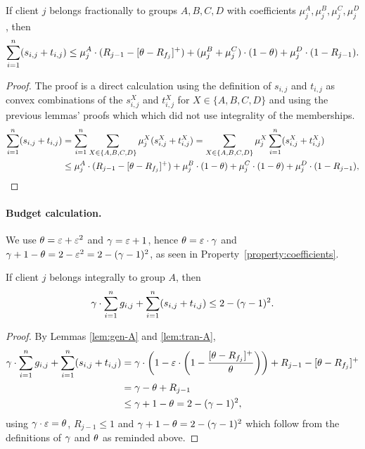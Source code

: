\begin{lemma}
    \label{lem:tran-fractional}
    If client $j$ belongs fractionally to groups $A,B,C,D$ with coefficients $\mu_j^A, \mu_j^B, \mu_j^C, \mu_j^D$, then
    \begin{equation*}
        \sum_{i=1}^n (s_{i,j} + t_{i,j}) \leq \mu_j^A \cdot (R_{j-1} - [\theta - R_{f_j}]^+) + (\mu_j^B + \mu_j^C) \cdot (1-\theta) + \mu_j^D \cdot (1 - R_{j-1}).
    \end{equation*}
\end{lemma}
\begin{proof}
    The proof is a direct calculation using the definition of $s_{i,j}$ and $t_{i,j}$ as convex combinations of the $s_{i,j}^X$ and $t_{i,j}^X$ for $X \in \{A,B,C,D\}$ and using the previous lemmas' proofs which which did not use integrality of the memberships.
    \begin{align*}
        \sum_{i=1}^n (s_{i,j} + t_{i,j})
        &= \sum_{i=1}^n \sum_{X\in\{A,B,C,D\}} \mu_j^X (s_{i,j}^X + t_{i,j}^X)
        = \sum_{X\in\{A,B,C,D\}} \mu_j^X \sum_{i=1}^n (s_{i,j}^X + t_{i,j}^X) \\
        &\leq \mu_j^A \cdot (R_{j-1} - [\theta - R_{f_j}]^+) + \mu_j^B \cdot (1-\theta) + \mu_j^C \cdot (1-\theta) + \mu_j^D \cdot (1 - R_{j-1}),
    \end{align*}
\end{proof}

\paragraph{Budget calculation.}

We use $\theta = \varepsilon + \varepsilon^2$ and $\gamma = \varepsilon + 1$, hence $\theta = \varepsilon \cdot \gamma$ and $\gamma + 1 - \theta = 2- \varepsilon^2 = 2-(\gamma-1)^2$, as seen in Property~\ref{property:coefficients}.

\begin{lemma}
    \label{lem:budget-A}
    If client $j$ belongs integrally to group $A$, then
    \begin{equation*}
        \gamma \cdot \sum_{i=1}^n g_{i,j} + \sum_{i=1}^n (s_{i,j} + t_{i,j}) \leq 2-(\gamma-1)^2.
    \end{equation*}
\end{lemma}
\begin{proof}
    By Lemmas \ref{lem:gen-A} and \ref{lem:tran-A},
    \begin{align*}
        \gamma \cdot \sum_{i=1}^n g_{i,j} + \sum_{i=1}^n (s_{i,j} + t_{i,j})
        &= \gamma \cdot \left(1 - \varepsilon \cdot \left(1 - \frac{[\theta - R_{f_j}]^+}{\theta}\right)\right) + R_{j-1} - [\theta - R_{f_j}]^+ \\
        &= \gamma - \theta + R_{j-1} \\
        &\le \gamma + 1 - \theta = 2-(\gamma-1)^2,
    \end{align*}
    using $\gamma \cdot \varepsilon = \theta$, $R_{j-1} \le 1$ and $\gamma + 1 - \theta = 2-(\gamma-1)^2$ which follow from the definitions of $\gamma$ and $\theta$ as reminded above.
\end{proof}

